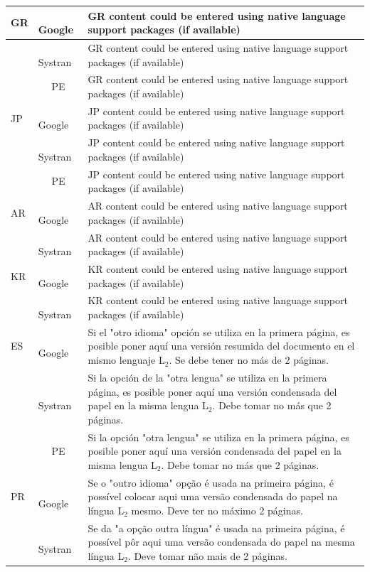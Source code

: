 \documentclass[10pt,a5paper,twoside]{article}
\begin{document}
\begin{longtable}{|l|l|p{10.5cm}|}
 \hline
 GR  &~~ Google  & GR content could be entered using native language support packages (if available) \\
 \hline
   &~~ Systran  & GR content could be entered using native language support packages (if available) \\
\hline
   &~~ PE  & GR content could be entered using native language support packages (if available) \\
\hline
JP  &~~ Google  & JP content could be entered using native language support packages (if available) \\
 \hline
   &~~ Systran  & JP content could be entered using native language support packages (if available) \\
 \hline
   &~~ PE  & JP content could be entered using native language support packages (if available) \\
 \hline
AR  &~~ Google  & AR content could be entered using native language support packages (if available) \\
 \hline
  &~~ Systran  & AR content could be entered using native language support packages (if available) \\
 \hline
KR  &~~ Google  & KR content could be entered using native language support packages (if available) \\
 \hline
  &~~ Systran  & KR content could be entered using native language support packages (if available)  \\
\hline
ES  &~~ Google  & Si el "otro idioma" opci\'on se utiliza en la primera p\'agina, es posible poner aqu\'i una versi\'on resumida del documento en el mismo lenguaje L$_{2}$. Se debe tener no m\'as de 2 p\'aginas.  \\
 \hline
   &~~ Systran  & Si la opci\'on de la "otra lengua" se utiliza en la primera p\'agina, es posible poner aqu\'i una versi\'on condensada del papel en la misma lengua L$_{2}$. Debe tomar no m\'as que 2 p\'aginas.  \\
 \hline
   &~~ PE   & Si la opci\'on "otra lengua" se utiliza en la primera p\'agina, es posible poner aqu\'i una versi\'on condensada del papel en la misma lengua L$_{2}$. Debe tomar no m\'as que 2 p\'aginas.\\
 \hline
PR  &~~ Google  & Se o "outro idioma" op\c{c}\~ao \'e usada na primeira p\'agina, \'e possível colocar aqui uma vers\~ao condensada do papel na língua L$_{2}$ mesmo. Deve ter no m\'aximo 2 p\'aginas. \\
\hline
  &~~ Systran  & Se da "a op\c{c}\~ao outra l\'ingua" \'e usada na primeira p\'agina, \'e poss\'ivel p\^or aqui uma vers\~ao condensada do papel na mesma l\'ingua L$_{2}$. Deve tomar n\~ao mais de 2 p\'aginas.  \\

\end{longtable}
\end{document}
